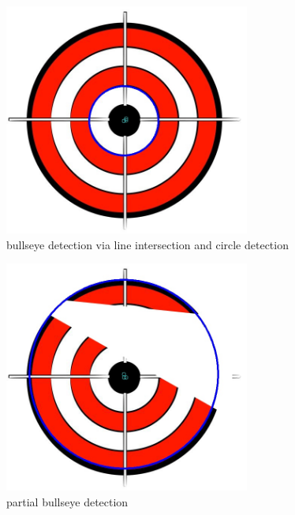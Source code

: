 \documentclass[11pt,a4paper]{article}
\begin{document}
\begin{figure}[H]
  \centering
  \includegraphics[width=0.72\textwidth]{bullseye_bullseye}
  \caption{bullseye detection via line intersection and circle detection}
  \label{fig:bullseye}
\end{figure}

\begin{figure}[H]
  \centering
  \includegraphics[width=0.72\textwidth]{bullseye_partial_bullseye}
  \caption{partial bullseye detection}
  \label{fig:partial_bullseye}
\end{figure}
\end{document}
